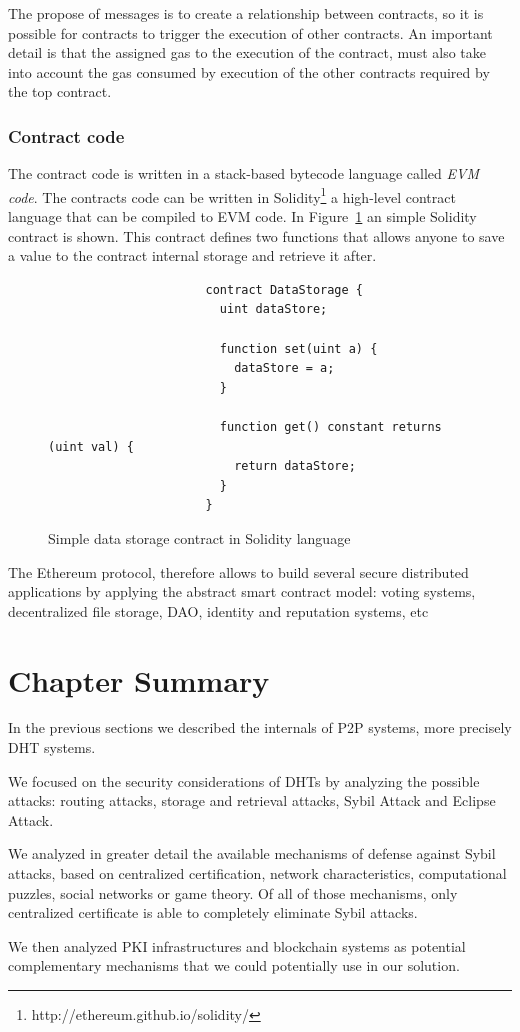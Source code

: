 The propose of messages is to create a relationship between contracts, so it is possible for contracts to trigger the execution of other contracts.
An important detail is that the assigned gas to the execution of the contract,
must also take into account the gas consumed by execution of the other contracts required by the top contract.

\subsubsection{Contract code} The contract code is written in a stack-based bytecode language called \textit{\ac{EVM} code}.
The contracts code can be written in Solidity\footnote{http://ethereum.github.io/solidity/} a high-level contract language that can be compiled to \ac{EVM} code.
In Figure~\ref{fig:solidity-example} an simple Solidity contract is shown.
This contract defines two functions that allows anyone to save a value to the contract internal storage and retrieve it after.

\begin{figure}[h!]
  \centering
                    \begin{Verbatim}
                      contract DataStorage {
                        uint dataStore;

                        function set(uint a) {
                          dataStore = a;
                        }

                        function get() constant returns (uint val) {
                          return dataStore;
                        }
                      }
                    \end{Verbatim}
  \caption{Simple data storage contract in Solidity language}
\label{fig:solidity-example}
\end{figure}

The Ethereum protocol, therefore allows to build several secure distributed applications by applying the abstract smart contract model: voting systems, decentralized file storage, \ac{DAO}, identity and reputation systems, etc

\section{Chapter Summary}

In the previous sections we described the internals of \ac{P2P} systems, more precisely \ac{DHT} systems.

We focused on the security considerations of \acp{DHT} by analyzing the possible attacks: routing attacks, storage and retrieval attacks, Sybil Attack and Eclipse Attack.

We analyzed in greater detail the available mechanisms of defense against Sybil attacks, based on centralized certification, network characteristics, computational puzzles, social networks or game theory.
Of all of those mechanisms, only centralized certificate is able to completely eliminate Sybil attacks.

We then analyzed \ac{PKI} infrastructures and blockchain systems as potential complementary mechanisms that we could potentially use in our solution.


